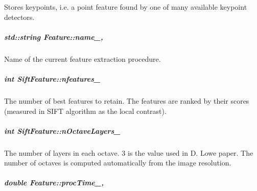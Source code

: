 Stores keypoints, i.\-e. a point feature found by one of many available keypoint detectors. 

\hypertarget{group___feature_extractor_a46e9fc1f327aaafb10de2c0425d311aa}{
\subparagraph[{name\-\_\-}]{\setlength{\rightskip}{0pt plus 5cm}std\-::string Feature\-::name\-\_\-\hspace{0.3cm}{\ttfamily [protected]}, {\ttfamily [inherited]}}}\label{group___feature_extractor_a46e9fc1f327aaafb10de2c0425d311aa}


Name of the current feature extraction procedure. 

\hypertarget{group___feature_extractor_a7b777845234b488ea905bd38f7ce323c}{
\subparagraph[{nfeatures\-\_\-}]{\setlength{\rightskip}{0pt plus 5cm}int Sift\-Feature\-::nfeatures\-\_\-\hspace{0.3cm}{\ttfamily [private]}}}\label{group___feature_extractor_a7b777845234b488ea905bd38f7ce323c}


The number of best features to retain. The features are ranked by their scores (measured in S\-I\-F\-T algorithm as the local contrast). 

\hypertarget{group___feature_extractor_aaf3149accfb0860cb148ea21cda53c12}{
\subparagraph[{n\-Octave\-Layers\-\_\-}]{\setlength{\rightskip}{0pt plus 5cm}int Sift\-Feature\-::n\-Octave\-Layers\-\_\-\hspace{0.3cm}{\ttfamily [private]}}}\label{group___feature_extractor_aaf3149accfb0860cb148ea21cda53c12}


The number of layers in each octave. 3 is the value used in D. Lowe paper. The number of octaves is computed automatically from the image resolution. 

\hypertarget{group___feature_extractor_a1b176bd48aad30b553e0f87f0264c3d0}{
\subparagraph[{proc\-Time\-\_\-}]{\setlength{\rightskip}{0pt plus 5cm}double Feature\-::proc\-Time\-\_\-\hspace{0.3cm}{\ttfamily [protected]}, {\ttfamily [inherited]}}}\label{group___feature_extractor_a1b176bd48aad30b553e0f87f0264c3d0}


